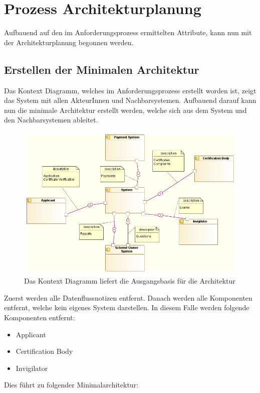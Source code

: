 \chapter{Prozess Architekturplanung}
Aufbauend auf den im Anforderungsprozess ermittelten Attribute, kann nun mit der Architekturplanung begonnen werden.

\section{Erstellen der Minimalen Architektur}
Das Kontext Diagramm, welches im Anforderungsprozess erstellt worden ist, zeigt das System mit allen AkteurInnen und Nachbarsystemen. Aufbauend darauf kann nun die minimale Architektur erstellt werden, welche sich aus dem System und den Nachbarsystemen ableitet.

\begin{figure}[H]
    \centering
    \includegraphics[scale=0.5]{uml/context.png}
    \caption{Das Kontext Diagramm liefert die Ausgangsbasis für die Architektur}
\end{figure}

Zuerst werden alle Datenflussnotizen entfernt. Danach werden alle Komponenten entfernt, welche kein eigenes System darstellen. In diesem Falle werden folgende Komponenten entfernt:

\begin{itemize}
  \item Applicant
  \item Certification Body
  \item Invigilator
\end{itemize}

Dies führt zu folgender Minimalarchitektur:

